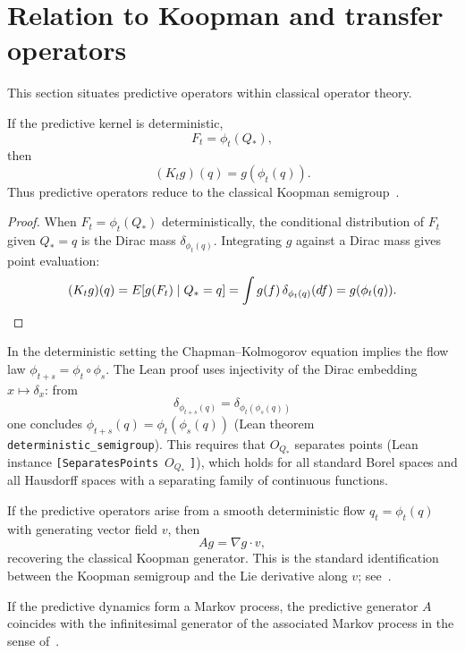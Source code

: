 \section[Relation to Koopman operators]{Relation to Koopman and transfer operators}\label{sec:koopman}

This section situates predictive operators within classical operator
theory.

\begin{proposition}\label{prop:deterministic}
If the predictive kernel is deterministic,
\[
F_t = \phi_t(Q_*),
\]
then
\[
(K_t g)(q) = g(\phi_t(q)).
\]
Thus predictive operators reduce to the classical Koopman semigroup~\cite{Koopman1931}.
\end{proposition}

\begin{proof}
When $F_t=\phi_t(Q_*)$ deterministically, the conditional distribution
of $F_t$ given $Q_*=q$ is the Dirac mass $\delta_{\phi_t(q)}$.
Integrating $g$ against a Dirac mass gives point evaluation:
\[
(K_t g)(q) = E[g(F_t)\mid Q_*=q] = \int g(f)\,\delta_{\phi_t(q)}(df) = g(\phi_t(q)).\qedhere
\]
\end{proof}

\begin{remark}
In the deterministic setting the Chapman--Kolmogorov equation implies
the flow law $\phi_{t+s}=\phi_t\circ\phi_s$.  The Lean proof uses
injectivity of the Dirac embedding $x\mapsto\delta_x$: from
\[
\delta_{\phi_{t+s}(q)}=\delta_{\phi_t(\phi_s(q))}
\]
one concludes $\phi_{t+s}(q)=\phi_t(\phi_s(q))$ (Lean theorem
\texttt{deterministic\_semigroup}).  This requires that $O_{Q_*}$
separates points (Lean instance \texttt{[SeparatesPoints}~$O_{Q_*}$%
\texttt{]}), which holds for all standard Borel spaces and all
Hausdorff spaces with a separating family of continuous functions.
\end{remark}

\begin{remark}\label{rem:koopman-generator}
If the predictive operators arise from a smooth deterministic flow
$q_t = \phi_t(q)$ with generating vector field $v$, then
\[
A g = \nabla g \cdot v,
\]
recovering the classical Koopman generator.  This is the standard
identification between the Koopman semigroup and the Lie derivative
along $v$; see~\cite[Ch.~1]{EngelNagel2000}.
\end{remark}

\begin{remark}\label{rem:markov-generator}
If the predictive dynamics form a Markov process, the predictive
generator $A$ coincides with the infinitesimal generator of the
associated Markov process in the sense of~\cite[Ch.~1]{EthierKurtz1986}.
\end{remark}

